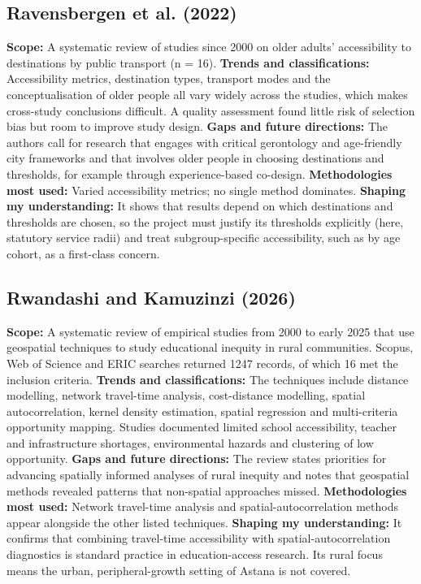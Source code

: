 \documentclass[journal]{IEEEtran}
\begin{document}
\subsection{Ravensbergen et al. (2022) \cite{ravensbergen2022}}
\textbf{Scope:} A systematic review of studies since 2000 on older adults' accessibility to destinations by public transport (n = 16).
\textbf{Trends and classifications:} Accessibility metrics, destination types, transport modes and the conceptualisation of older people all vary widely across the studies, which makes cross-study conclusions difficult. A quality assessment found little risk of selection bias but room to improve study design.
\textbf{Gaps and future directions:} The authors call for research that engages with critical gerontology and age-friendly city frameworks and that involves older people in choosing destinations and thresholds, for example through experience-based co-design.
\textbf{Methodologies most used:} Varied accessibility metrics; no single method dominates.
\textbf{Shaping my understanding:} It shows that results depend on which destinations and thresholds are chosen, so the project must justify its thresholds explicitly (here, statutory service radii) and treat subgroup-specific accessibility, such as by age cohort, as a first-class concern.

\subsection{Rwandashi and Kamuzinzi (2026) \cite{rwandashi2026}}
\textbf{Scope:} A systematic review of empirical studies from 2000 to early 2025 that use geospatial techniques to study educational inequity in rural communities. Scopus, Web of Science and ERIC searches returned 1247 records, of which 16 met the inclusion criteria.
\textbf{Trends and classifications:} The techniques include distance modelling, network travel-time analysis, cost-distance modelling, spatial autocorrelation, kernel density estimation, spatial regression and multi-criteria opportunity mapping. Studies documented limited school accessibility, teacher and infrastructure shortages, environmental hazards and clustering of low opportunity.
\textbf{Gaps and future directions:} The review states priorities for advancing spatially informed analyses of rural inequity and notes that geospatial methods revealed patterns that non-spatial approaches missed.
\textbf{Methodologies most used:} Network travel-time analysis and spatial-autocorrelation methods appear alongside the other listed techniques.
\textbf{Shaping my understanding:} It confirms that combining travel-time accessibility with spatial-autocorrelation diagnostics is standard practice in education-access research. Its rural focus means the urban, peripheral-growth setting of Astana is not covered.
\end{document}
